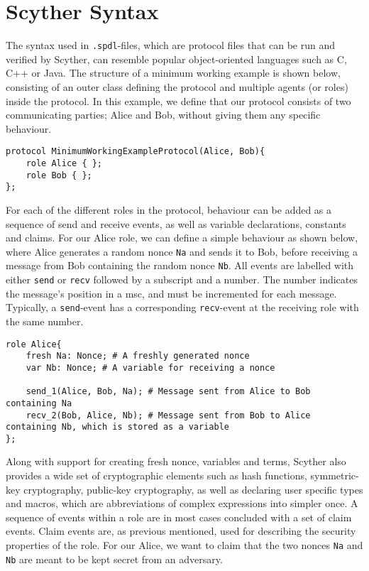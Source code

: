  
\section{Scyther Syntax}


The syntax used in \verb!.spdl!-files, which are protocol files that can be run and verified by Scyther, can resemble popular object-oriented languages such as C, C++ or Java. The structure of a minimum working example is shown below, consisting of an outer class defining the protocol and multiple agents (or roles) inside the protocol. In this example, we define that our protocol consists of two communicating parties; Alice and Bob, without giving them any specific behaviour.

\begin{lstlisting}
protocol MinimumWorkingExampleProtocol(Alice, Bob){
	role Alice { };
	role Bob { };  
};
\end{lstlisting}


For each of the different roles in the protocol, behaviour can be added as a sequence of send and receive events, as well as variable declarations, constants and claims. For our Alice role, we can define a simple behaviour as shown below, where Alice generates a random nonce \texttt{Na} and sends it to Bob, before receiving a message from Bob containing the random nonce \texttt{Nb}. All events are labelled with either \texttt{send} or \texttt{recv} followed by a subscript and a number. The number indicates the message's position in a \gls{msc}, and must be incremented for each message. Typically, a \texttt{send}-event has a corresponding \texttt{recv}-event at the receiving role with the same number.


\begin{lstlisting}
role Alice{
	fresh Na: Nonce; # A freshly generated nonce
	var Nb: Nonce; # A variable for receiving a nonce
	
	send_1(Alice, Bob, Na); # Message sent from Alice to Bob containing Na
	recv_2(Bob, Alice, Nb); # Message sent from Bob to Alice containing Nb, which is stored as a variable
};
\end{lstlisting}


Along with support for creating fresh nonce, variables and terms, Scyther also provides a wide set of cryptographic elements such as hash functions, symmetric-key cryptography, public-key cryptography, as well as declaring user specific types and macros, which are abbreviations of complex expressions into simpler once. A sequence of events within a role are in most cases concluded with a set of claim events. Claim events are, as previous mentioned, used for describing the security properties of the role. For our Alice, we want to claim that the two nonces \texttt{Na} and \texttt{Nb} are meant to be kept secret from an adversary.


